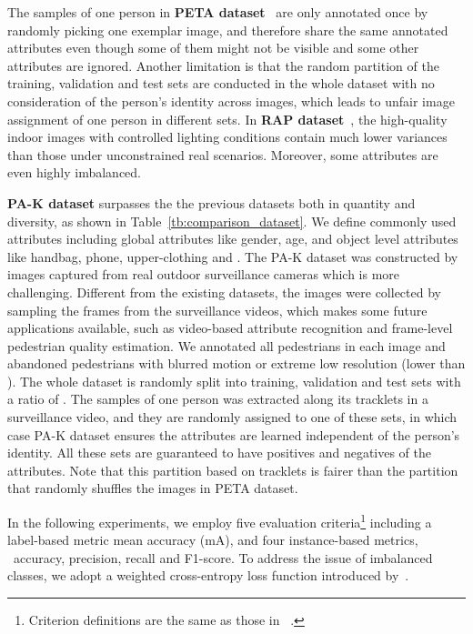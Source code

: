 \documentclass[10pt,twocolumn,letterpaper]{article}
\begin{document}
The samples of one person in \textbf{PETA dataset}~\cite{deng2014pedestrian} are only annotated once by randomly picking one exemplar image, and therefore share the same annotated attributes even though some of them might not be visible and some other attributes are ignored.
Another limitation is that the random partition of the training, validation and test sets are conducted in the whole dataset with no consideration of the person's identity across images, which leads to unfair image assignment of one person in different sets.
In \textbf{RAP dataset}~\cite{li2016richly}, the high-quality indoor images with controlled lighting conditions contain much lower variances than those under unconstrained real scenarios.
Moreover, some attributes are even highly imbalanced.





\textbf{PA-K dataset}
surpasses the the previous datasets both in quantity and diversity, as shown in Table~\ref{tb:comparison_dataset}.
We define  commonly used attributes including global attributes like gender, age, and object level attributes like handbag, phone, upper-clothing and \etc.
The PA-K dataset was constructed by images captured from real outdoor surveillance cameras which is more challenging. Different from the existing datasets, the images were collected by sampling the frames from the surveillance videos, which makes some future applications available, such as video-based attribute recognition and frame-level pedestrian quality estimation.
We annotated all pedestrians in each image and abandoned pedestrians with blurred motion or extreme low resolution (lower than ).
The whole dataset is randomly split into training, validation and test sets with a ratio of .
The samples of one person was extracted along its tracklets in a surveillance video, and they are randomly assigned to one of these sets, in which case PA-K dataset ensures the attributes are learned independent of the person's identity.
All these sets are guaranteed to have positives and negatives of the  attributes.
Note that this partition based on tracklets is fairer than the partition that randomly shuffles the images in PETA dataset.

In the following experiments, we employ five evaluation criteria\footnote{Criterion definitions are the same as those in ~\cite{li2016richly}.} including a label-based metric mean accuracy (mA), and four instance-based metrics, \ie~accuracy, precision, recall and F1-score.
To address the issue of imbalanced classes, we adopt a weighted cross-entropy loss function introduced by~\cite{li2015multi}.
\end{document}
